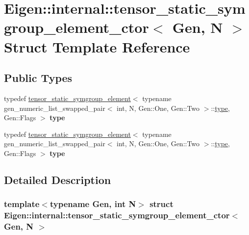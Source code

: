\hypertarget{struct_eigen_1_1internal_1_1tensor__static__symgroup__element__ctor}{}\section{Eigen\+:\+:internal\+:\+:tensor\+\_\+static\+\_\+symgroup\+\_\+element\+\_\+ctor$<$ Gen, N $>$ Struct Template Reference}
\label{struct_eigen_1_1internal_1_1tensor__static__symgroup__element__ctor}
\subsection*{Public Types}
\begin{DoxyCompactItemize}
\item 
\mbox{\label{struct_eigen_1_1internal_1_1tensor__static__symgroup__element__ctor_a899761540fc394be397b737ef1b70c9d}} 
typedef \hyperlink{struct_eigen_1_1internal_1_1tensor__static__symgroup__element}{tensor\+\_\+static\+\_\+symgroup\+\_\+element}$<$ typename gen\+\_\+numeric\+\_\+list\+\_\+swapped\+\_\+pair$<$ int, N, Gen\+::\+One, Gen\+::\+Two $>$\+::\hyperlink{struct_eigen_1_1internal_1_1tensor__static__symgroup__element}{type}, Gen\+::\+Flags $>$ {\bfseries type}
\item 
\mbox{\label{struct_eigen_1_1internal_1_1tensor__static__symgroup__element__ctor_a899761540fc394be397b737ef1b70c9d}} 
typedef \hyperlink{struct_eigen_1_1internal_1_1tensor__static__symgroup__element}{tensor\+\_\+static\+\_\+symgroup\+\_\+element}$<$ typename gen\+\_\+numeric\+\_\+list\+\_\+swapped\+\_\+pair$<$ int, N, Gen\+::\+One, Gen\+::\+Two $>$\+::\hyperlink{struct_eigen_1_1internal_1_1tensor__static__symgroup__element}{type}, Gen\+::\+Flags $>$ {\bfseries type}
\end{DoxyCompactItemize}


\subsection{Detailed Description}
\subsubsection*{template$<$typename Gen, int N$>$\newline
struct Eigen\+::internal\+::tensor\+\_\+static\+\_\+symgroup\+\_\+element\+\_\+ctor$<$ Gen, N $>$}



